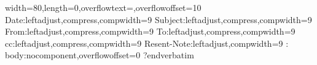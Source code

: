 
\verbatim
width=80,length=0,overflowtext=,overflowoffset=10
Date:leftadjust,compress,compwidth=9
Subject:leftadjust,compress,compwidth=9
From:leftadjust,compress,compwidth=9
To:leftadjust,compress,compwidth=9
cc:leftadjust,compress,compwidth=9
Resent-Note:leftadjust,compwidth=9
:
body:nocomponent,overflowoffset=0
?endverbatim
